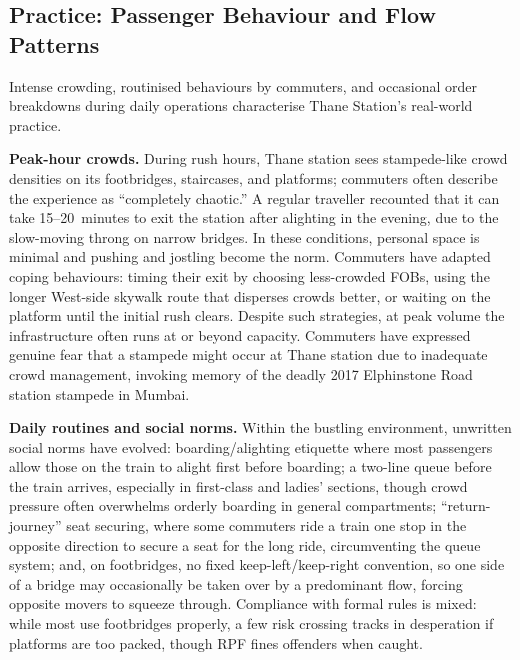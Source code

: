 \documentclass[11pt]{article}
\begin{document}
\subsection{Practice: Passenger Behaviour and Flow Patterns}

Intense crowding, routinised behaviours by commuters, and occasional order breakdowns during
daily operations characterise Thane Station's real-world practice.

\textbf{Peak-hour crowds.} During rush hours, Thane station sees stampede-like crowd densities
on its footbridges, staircases, and platforms; commuters often describe the experience as
``completely chaotic.'' A regular traveller recounted that it can take 15--20~minutes to exit
the station after alighting in the evening, due to the slow-moving throng on narrow bridges. In
these conditions, personal space is minimal and pushing and jostling become the norm. Commuters
have adapted coping behaviours: timing their exit by choosing less-crowded FOBs, using the
longer West-side skywalk route that disperses crowds better, or waiting on the platform until
the initial rush clears. Despite such strategies, at peak volume the infrastructure often runs
at or beyond capacity. Commuters have expressed genuine fear that a stampede might occur at
Thane station due to inadequate crowd management, invoking memory of the deadly 2017
Elphinstone Road station stampede in Mumbai.

\textbf{Daily routines and social norms.} Within the bustling environment, unwritten social
norms have evolved: boarding/alighting etiquette where most passengers allow those on the train
to alight first before boarding; a two-line queue before the train arrives, especially in
first-class and ladies' sections, though crowd pressure often overwhelms orderly boarding in
general compartments; ``return-journey'' seat securing, where some commuters ride a train one
stop in the opposite direction to secure a seat for the long ride, circumventing the queue
system; and, on footbridges, no fixed keep-left/keep-right convention, so one side of a bridge
may occasionally be taken over by a predominant flow, forcing opposite movers to squeeze
through. Compliance with formal rules is mixed: while most use footbridges properly, a few risk
crossing tracks in desperation if platforms are too packed, though RPF fines offenders when
caught.
\end{document}
